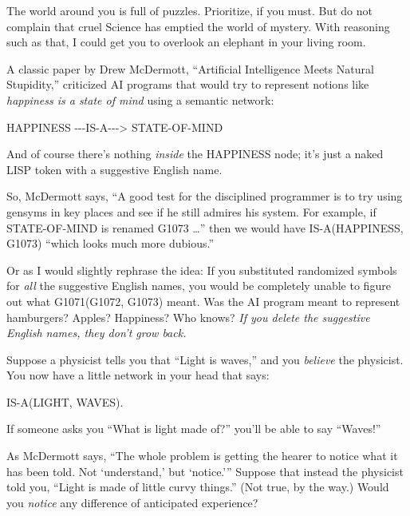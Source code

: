 {
 The world around you is full of puzzles. Prioritize, if you must.
But do not complain that cruel Science has emptied the world of
mystery. With reasoning such as that, I could get you to overlook an
elephant in your living room.}

\myendsectiontext


{
 A classic paper by Drew McDermott, ``Artificial
Intelligence Meets Natural Stupidity,'' criticized AI
programs that would try to represent notions like \textit{happiness is
a state of mind} using a semantic network:}

{\centering
 HAPPINESS -{}-{}-IS-A-{}-{}-{\textgreater} STATE-OF-MIND
\par}


\bigskip

{
 And of course there's nothing \textit{inside} the
HAPPINESS node; it's just a naked LISP token with a
suggestive English name.}

{
 So, McDermott says, ``A good test for the
disciplined programmer is to try using gensyms in key places and see if
he still admires his system. For example, if STATE-OF-MIND is renamed
G1073 \ldots'' then we would have IS-A(HAPPINESS,
G1073) ``which looks much more
dubious.''}

{
 Or as I would slightly rephrase the idea: If you substituted
randomized symbols for \textit{all} the suggestive English names, you
would be completely unable to figure out what G1071(G1072, G1073)
meant. Was the AI program meant to represent hamburgers? Apples?
Happiness? Who knows? \textit{If you delete the suggestive English
names, they don't grow back.}}

{
 Suppose a physicist tells you that ``Light is
waves,'' and you \textit{believe} the physicist. You
now have a little network in your head that says:}

{\centering
 IS-A(LIGHT, WAVES).
\par}


\bigskip

{
 If someone asks you ``What is light made
of?'' you'll be able to say
``Waves!'' }

{
 As McDermott says, ``The whole problem is getting
the hearer to notice what it has been told. Not
`understand,' but
`notice.''' Suppose
that instead the physicist told you, ``Light is made
of little curvy things.'' (Not true, by the way.)
Would you \textit{notice} any difference of anticipated experience?}

